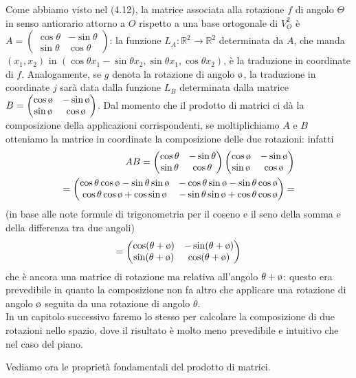 \begin{esempio}
  Come abbiamo visto nel (4.12), la matrice associata alla rotazione $f$ di angolo $\Theta$ in
   senso antiorario attorno a $O$ rispetto a una base ortogonale di $V_O^2$ è $A =
   \begin{pmatrix}
     \cos\theta & -\sin \theta\\
     \sin\theta & \cos \theta
   \end{pmatrix}
   $: la funzione $L_A:\mathbb{R}^2\to \mathbb{R}^2$ determinata da $A$, che manda $(x_1,x_2)$ in
   $(\cos \theta x_1-\sin\theta x_2,\sin\theta x_1,\cos\theta x_2)$, è la traduzione in coordinate
   di $f$. Analogamente, se $g$ denota la rotazione di angolo $\clock$, la traduzione in
   coordinate $j$ sarà data dalla funzione $L_B$ determinata dalla matrice $B=
   \begin{pmatrix}
     \cos\clock & -\sin\clock \\
     \sin \clock & \cos\clock
   \end{pmatrix}
   $. Dal momento che il prodotto di matrici ci dà la composizione della applicazioni
   corrispondenti, se moltiplichiamo $A$ e $B$ otteniamo la matrice in coordinate la
   composizione delle due rotazioni: infatti
   \begin{eqnarray*}
     AB=
     \begin{pmatrix}
       \cos\theta &-\sin\theta\\
       \sin\theta& \cos\theta
     \end{pmatrix}
     \begin{pmatrix}
       \cos\clock&-\sin\clock\\
       \sin\clock & \cos \clock
     \end{pmatrix}\\
     =
     \begin{pmatrix}
       \cos\theta\cos\clock-\sin\theta\sin\clock &-\cos\theta\sin\clock-\sin\theta\cos\clock\\
       \cos\theta \cos\clock+\cos\sin\clock & -\sin\theta\sin\clock+\cos\theta\cos\clock
     \end{pmatrix}=
   \end{eqnarray*}
   (in base alle note formule di trigonometria per il coseno e il seno della somma e della
   differenza tra due angoli)
   \begin{equation*}
     =
     \begin{pmatrix}
       \cos(\theta+\clock) &-\sin(\theta+\clock)\\
       \sin(\theta+\clock) & \cos(\theta+\clock)
     \end{pmatrix}
   \end{equation*}
   che è ancora una matrice di rotazione ma relativa all'angolo $\theta+\clock$: questo era
   prevedibile in quanto la composizione non fa altro che applicare una rotazione di angolo
   $\clock$ seguita da una rotazione di angolo $\theta$.\\
   In un capitolo successivo faremo lo stesso per calcolare la composizione di due rotazioni
   nello spazio, dove il risultato è molto meno prevedibile e intuitivo che nel caso del piano.
\end{esempio}
Vediamo ora le proprietà fondamentali del prodotto di matrici.

